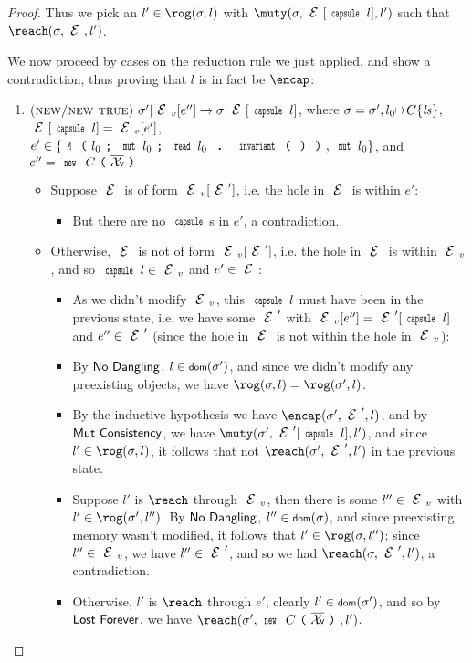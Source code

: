\begin{proof}
	Thus we pick an $l'\in\rog(\s,l)$ with $\muty(\s,\E[\Kw{capsule}\,l],l')$
	such that $\reach(\s,\E,l')$.
	
	We now proceed by cases on the reduction rule we just applied, and
	show a contradiction, thus proving that $l$ is in fact be $\encap$:
	\begin{enumerate}
		\item $\crule{new/new true}{\s'}{\EV[e'']}{\s}{\E[\Kw{capsule}\,l]}$, where
		$\s = \s',l_0\mapsto C\{\ls\}$, $\E[\Kw{capsule}\,l] = \EV[e']$, $e'\in\{\M{l_0}{\Kw{mut}\,l_0}{\invariant{l_0}},\,\Kw{mut}\,l_0\}$,
		and $e'' = \new C{\vs}$
		\begin{itemize}
			\item Suppose $\E$ is of form $\EV[\E']$, i.e. the hole in $\E$ is within
			$e'$:
			\begin{itemize}
				\item But there are no $\Kw{capsule}$s in $e'$, a contradiction.
			\end{itemize}
			\item Otherwise, $\E$ is not of form $\EV[\E']$, i.e. the hole in $\E$
			is within $\EV$, and so $\Kw{capsule}\,l\in\EV$ and $e'\in\E$:
			\begin{itemize}
				\item As we didn't modify $\EV$, this $\Kw{capsule}\,l$ must have been in the
				previous state, i.e. we have some $\E'$ with $\EV[e''] = \E'[\Kw{capsule}\,l]$
				and $e''\in\E'$ (since the hole in $\E$ is not within the hole
				in $\EV$):
				\item By $\textsf{No Dangling}$, $l\in\dom(\s')$, and since we didn't
				modify any preexisting objects, we have $\rog(\s,l) = \rog(\s',l)$.
				\item By the inductive hypothesis we have $\encap(\s',\E',l)$, and by $\textsf{Mut Consistency}$,
				we have $\muty(\s',\E'[\Kw{capsule}\,l],l')$, and since $l'\in\rog(\s,l)$,
				it follows that not $\reach(\s',\E',l')$ in the previous state.
				\item Suppose $l'$ is $\reach$ through $\EV$, then there is some $l''\in\EV$
				with $l'\in\rog(\s',l'')$. By $\textsf{No Dangling}$, $l''\in\dom(\s)$,
				and since preexisting memory wasn't modified, it follows that $l'\in\rog(\s,l'')$;
				since $l''\in\EV$, we have $l''\in\E'$, and so we had $\reach(\s,\E',l')$,
				a contradiction.
				\item Otherwise, $l'$ is $\reach$ through $e'$, clearly $l'\in\dom(\s')$,
				and so by $\textsf{Lost Forever}$, we have $\reach(\s',\new C{\vs},l')$.

\end{itemize}
\end{itemize}
\end{enumerate}
\end{proof}
